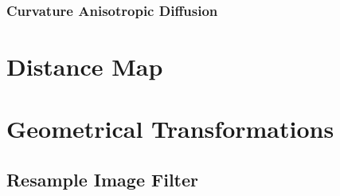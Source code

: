 %

\subsubsection{Curvature Anisotropic Diffusion}
\label{sec:ColorCurvatureAnisotropicDiffusion}

%



\section{Distance Map}
\label{sec:DistanceMap}

%



\section{Geometrical Transformations}
\label{sec:GeometricalTransformationFilters}

\subsection{Resample Image Filter}




